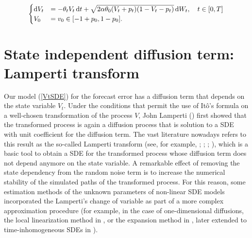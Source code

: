 \documentclass[11pt]{article}
\theoremstyle{definition}
\begin{document}
\begin{equation}
\begin{cases}
\dif V_t&=  - \theta_t V_t\dif t + \sqrt{2 \alpha \theta_0 (V_t +p_t ) (1-V_t-p_t)}\dif W_t, \quad t \in [0,T]  \\
V_0&=  v_0\in [-1 + p_0,1 - p_0].
\end{cases}  \label{VtSDE}
\end{equation}



\section{State independent diffusion term: Lamperti transform} \label{Section_4}

Our model (\ref{VtSDE}) for the forecast error has a diffusion term that depends on the state variable $V_t$. Under the conditions that permit the use of It\^{o}'s formula on a well-chosen transformation of the process $V$, John Lamperti (\cite{lamp}) first showed that the transformed process is again a diffusion process that is solution to a SDE with unit coefficient for the diffusion term. 
The vast literature nowadays refers to this result as the so-called Lamperti transform (see, for example, \cite[40--41]{iacus1}; \cite{moma}; \cite[199--203]{pani}; \cite[98--100]{saso}), which is a basic tool to obtain a SDE for the transformed process whose diffusion term does not depend anymore on the state variable. A remarkable effect of removing the state dependency from the random noise term is to increase the numerical stability of the simulated paths of the transformed process. 
For this reason, some estimation methods of the unknown parameters of non-linear SDE models incorporated the Lamperti's change of variable as part of a more complex approximation procedure (for example, in the case of one-dimensional diffusions, the local linearization method in  \cite{shoz}, or the expansion method in \cite{ait}, later extended to time-inhomogeneous SDEs in \cite{eglix}).
\end{document}
